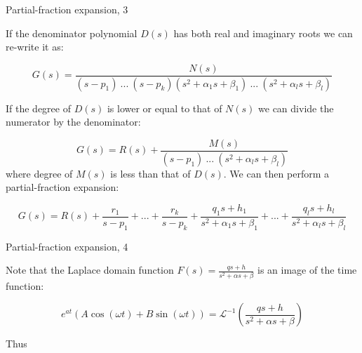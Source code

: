 \documentclass{beamer}
\begin{document}
\begin{frame}{Partial-fraction expansion, 3}
	\begin{flushleft}
		
		If the denominator polynomial $D(s)$ has both real and imaginary roots we can re-write it as:
		
		\begin{equation}
			G(s) = \frac{N(s)}{(s - p_1) \ ... \ (s - p_k)(s^2 + \alpha_1 s + \beta_1) \ ... \ (s^2 + \alpha_l s + \beta_l)}
		\end{equation}		
		
		If the degree of $D(s)$ is lower or equal to that of  $N(s)$ we can divide the numerator by the denominator:
		
		\begin{equation*}
			G(s) = R(s) + \frac{M(s)}{(s - p_1) \ ... \ (s^2 + \alpha_l s + \beta_l)}
		\end{equation*}		
		where degree of $M(s)$ is less than that of $D(s)$. We can then perform a partial-fraction expansion:
		
		\begin{equation*}
			G(s) = R(s) + 
			\frac{r_1}{s - p_1} +  ... + \frac{r_k}{s - p_k} +  \frac{q_1 s+ h_1}{s^2 + \alpha_1 s + \beta_1} +  ... + \frac{q_l s+ h_l}{s^2 + \alpha_l s + \beta_l}
		\end{equation*}		
		
	\end{flushleft}
\end{frame}



\begin{frame}{Partial-fraction expansion, 4}
	\begin{flushleft}
		
		Note that the Laplace domain function $F(s) = \frac{q s+ h}{s^2 + \alpha s + \beta}$ is an image of the time function:
		
		\begin{equation*}
			e^{at}(A \cos(\omega t) + B \sin(\omega t)) 
			 = \mathcal{L}^{-1}\left( \frac{q s+ h}{s^2 + \alpha s + \beta}\right)
		\end{equation*}		
		
		Thus 
		
	\end{flushleft}
\end{frame}
\end{document}
